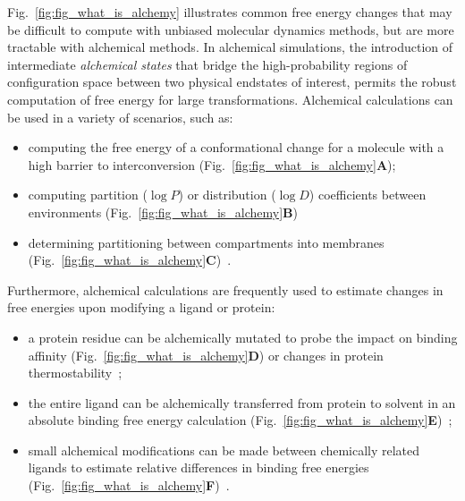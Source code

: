 \documentclass[9pt,bestpractices]{livecoms}
\begin{document}
Fig.~\ref{fig:fig_what_is_alchemy} illustrates common free energy changes that may be difficult to compute with unbiased molecular dynamics methods, but are more tractable with alchemical methods.
In alchemical simulations, the introduction of intermediate \textit{alchemical states} that bridge the high-probability regions of configuration space between two physical endstates of interest, permits the robust computation of free energy for large transformations.
Alchemical calculations can be used in a variety of scenarios, such as: 
\begin{itemize}
\item computing the free energy of a conformational change for a molecule with a high barrier to interconversion (Fig.~\ref{fig:fig_what_is_alchemy}\textbf{A});
\item computing partition ($\log P$) or distribution ($\log D$) coefficients between environments (Fig.~\ref{fig:fig_what_is_alchemy}\textbf{B})~\cite{rustenburg2016measuring, bosisio2016blinded} 
\item determining partitioning between compartments into membranes (Fig.~\ref{fig:fig_what_is_alchemy}\textbf{C})~\cite{corey2019insights}. 
\end{itemize}

Furthermore, alchemical calculations are frequently used to estimate changes in free energies upon modifying a ligand or protein: 
\begin{itemize}
\item a protein residue can be alchemically mutated to probe the impact on binding affinity (Fig.~\ref{fig:fig_what_is_alchemy}\textbf{D})\cite{hauser2018predicting,aldeghi2018accurate} or changes in protein thermostability~\cite{seeliger2010protein,gapsys2016insights,gapsys2016accurate,aldeghi2019accurate}; 
\item the entire ligand can be alchemically transferred from protein to solvent in an absolute binding free energy calculation (Fig.~\ref{fig:fig_what_is_alchemy}\textbf{E})~\cite{mobley2007predicting,aldeghi2015accurate,aldeghi2017predictions}; 
\item small alchemical modifications can be made between chemically related ligands to estimate relative differences in binding free energies (Fig.~\ref{fig:fig_what_is_alchemy}\textbf{F})~\cite{wang2015accurate,mey2016blinded,song2019using,gapsys2020large,kuhn2020assessment}.
\end{itemize}
\end{document}
